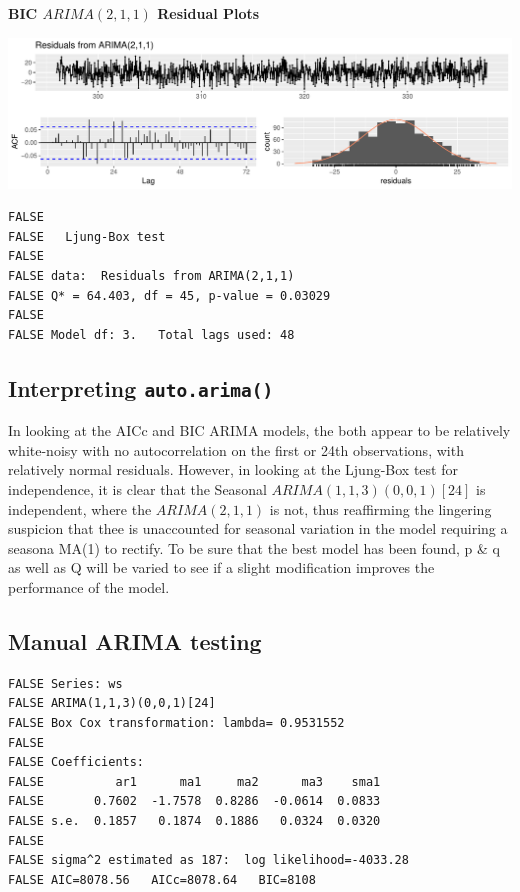 \documentclass[openany]{book}
\begin{document}
\textbf{BIC \(ARIMA(2,1,1)\) Residual Plots}

\includegraphics{Group2_Project1_Fall2019_files/figure-latex/unnamed-chunk-23-1.pdf}

\begin{verbatim}
FALSE 
FALSE   Ljung-Box test
FALSE 
FALSE data:  Residuals from ARIMA(2,1,1)
FALSE Q* = 64.403, df = 45, p-value = 0.03029
FALSE 
FALSE Model df: 3.   Total lags used: 48
\end{verbatim}

\hypertarget{interpreting-auto.arima}{%
\subsection{\texorpdfstring{Interpreting
\texttt{auto.arima()}}{Interpreting auto.arima()}}\label{interpreting-auto.arima}}

In looking at the AICc and BIC ARIMA models, the both appear to be
relatively white-noisy with no autocorrelation on the first or 24th
observations, with relatively normal residuals. However, in looking at
the Ljung-Box test for independence, it is clear that the Seasonal
\(ARIMA (1,1,3)(0,0,1)[24]\) is independent, where the \(ARIMA(2,1,1)\)
is not, thus reaffirming the lingering suspicion that thee is
unaccounted for seasonal variation in the model requiring a seasona
MA(1) to rectify. To be sure that the best model has been found, p \& q
as well as Q will be varied to see if a slight modification improves the
performance of the model.

\hypertarget{manual-arima-testing}{%
\subsection{Manual ARIMA testing}\label{manual-arima-testing}}

\begin{verbatim}
FALSE Series: ws 
FALSE ARIMA(1,1,3)(0,0,1)[24] 
FALSE Box Cox transformation: lambda= 0.9531552 
FALSE 
FALSE Coefficients:
FALSE          ar1      ma1     ma2      ma3    sma1
FALSE       0.7602  -1.7578  0.8286  -0.0614  0.0833
FALSE s.e.  0.1857   0.1874  0.1886   0.0324  0.0320
FALSE 
FALSE sigma^2 estimated as 187:  log likelihood=-4033.28
FALSE AIC=8078.56   AICc=8078.64   BIC=8108
\end{verbatim}
\end{document}
